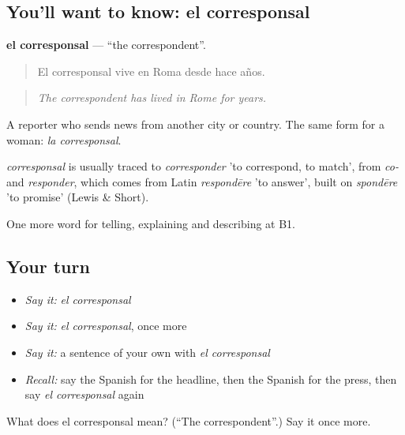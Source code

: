 \subsection*{You'll want to know: el corresponsal}
\textbf{el corresponsal} — \textquotedblleft{}the correspondent\textquotedblright{}.

\begin{quote}
El corresponsal vive en Roma desde hace años.
\end{quote}

\begin{quote}
\emph{The correspondent has lived in Rome for years.}
\end{quote}

A reporter who sends news from another city or country. The same form for a woman: \emph{la corresponsal}.

\begin{cousinweb}
\emph{corresponsal} is usually traced to \emph{corresponder} 'to correspond, to match', from \emph{co-} and \emph{responder}, which comes from Latin \emph{respondēre} 'to answer', built on \emph{spondēre} 'to promise' (Lewis \& Short).
\end{cousinweb}

\begin{grammarlens}[title={What you've built}]
One more word for telling, explaining and describing at B1.
\end{grammarlens}

\subsection*{Your turn}
\begin{itemize}
\raggedright
  \item \emph{Say it:} \emph{el corresponsal}
  \item \emph{Say it:} \emph{el corresponsal}, once more
  \item \emph{Say it:} a sentence of your own with \emph{el corresponsal}
  \item \emph{Recall:} say the Spanish for the headline, then the Spanish for the press, then say \emph{el corresponsal} again
\end{itemize}

\begin{tcolorbox}[breakable,colback=teal!4,colframe=teal!35!black,title={Before you move on}]
What does el corresponsal mean? (\textquotedblleft{}The correspondent\textquotedblright{}.) Say it once more.
\end{tcolorbox}
